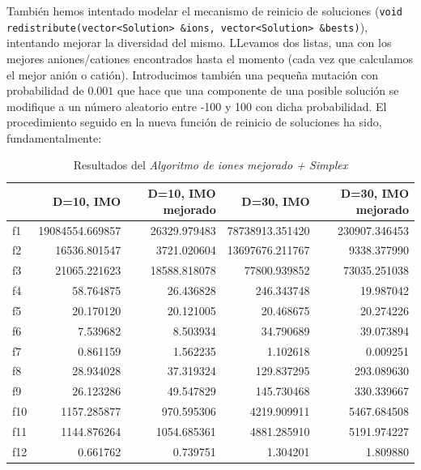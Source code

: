 \documentclass[a4paper,11pt]{article}
\begin{document}
\begin{itemize}
 También hemos intentado modelar el mecanismo de reinicio de soluciones (\texttt{void redistribute(vector<Solution> \&ions, vector<Solution> \&bests)}),
 intentando mejorar la diversidad del mismo. LLevamos dos listas, una con los mejores aniones/cationes encontrados hasta el momento
 (cada vez que calculamos el mejor anión o catión). Introducimos también una pequeña mutación con probabilidad de $0.001$
 que hace que una componente de una posible solución se modifique a un número aleatorio entre -100 y 100 con dicha probabilidad.
 El procedimiento seguido en la nueva función de reinicio de soluciones ha sido, fundamentalmente:
 
  \small{\texttt{}}
  \normalsize 
 
 \begin{table}[H]	
  \caption{Resultados del \textit{Algoritmo de iones mejorado + Simplex}}
  \centering
  \begin{tabular}{|l|r|r|||r|r|}
  \hline
  & \textbf{D=10, IMO} & \textbf{D=10, IMO mejorado} & \textbf{D=30, IMO} & \textbf{D=30, IMO mejorado}\\ \hline
  f1 &  19084554.669857 &  26329.979483 &  78738913.351420 &  230907.346453 \\ \hline
  f2 &  16536.801547 &  3721.020604 &  13697676.211767 &  9338.377990 \\ \hline
  f3 &  21065.221623 &  18588.818078 &  77800.939852 &  73035.251038 \\ \hline
  f4 &  58.764875 &  26.436828 &  246.343748 &  19.987042 \\ \hline
  f5 &  20.170120 &  20.121005 &  20.468675 &  20.274226 \\ \hline
  f6 &  7.539682 &  8.503934 &  34.790689 &  39.073894 \\ \hline
  f7 &  0.861159 &  1.562235 &  1.102618 &  0.009251 \\ \hline
  f8 &  28.934028 &  37.319324 &  129.837295 &  293.089630 \\ \hline
  f9 &  26.123286 &  49.547829 &  145.730468 &  330.339667 \\ \hline
  f10 &  1157.285877 &  970.595306 &  4219.909911 &  5467.684508 \\ \hline
  f11 &  1144.876264 &  1054.685361 &  4881.285910 &  5191.974227 \\ \hline
  f12 &  0.661762 &  0.739751 &  1.304201 &  1.809880 \\ \hline

\end{tabular}
\end{table}
\end{itemize}
\end{document}
